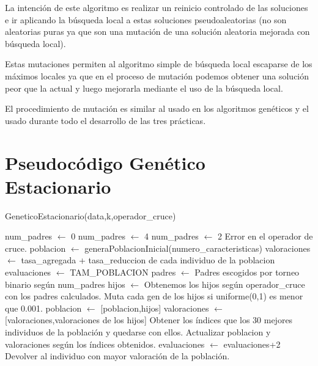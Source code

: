 \documentclass[12pt,a4paper]{article}
\begin{document}
	La intención de este algoritmo es realizar un reinicio controlado de las soluciones e ir aplicando la búsqueda local a estas soluciones pseudoaleatorias (no son aleatorias puras ya que son una mutación de una solución aleatoria mejorada con búsqueda local).
	
	Estas mutaciones permiten al algoritmo simple de búsqueda local escaparse de los máximos locales ya que en el proceso de mutación podemos obtener una solución peor que la actual y luego mejorarla mediante el uso de la búsqueda local.
	
	El procedimiento de mutación es similar al usado en los algoritmos genéticos y el usado durante todo el desarrollo de las tres prácticas.

	\section{Pseudocódigo Genético Estacionario}
	\label{sec:GE}


	\begin{algorithm}
		\caption{GeneticoEstacionario(data,k,operador\_cruce)}
		\begin{algorithmic}
			\STATE num\_padres $\leftarrow$ 0
				\STATE num\_padres $\leftarrow$ 4
				\STATE num\_padres $\leftarrow$ 2
			\ELSE
				\STATE Error en el operador de cruce.
			\ENDIF
			\STATE
			\STATE poblacion $\leftarrow$ generaPoblacionInicial(numero\_caracteristicas)
			\STATE valoraciones $\leftarrow$ tasa\_agregada + tasa\_reduccion de cada individuo de la poblacion
			\STATE evaluaciones $\leftarrow$ TAM\_POBLACION
				\STATE padres $\leftarrow$ Padres escogidos por torneo binario según num\_padres
				\STATE hijos $\leftarrow$ Obtenemos los hijos según operador\_cruce con los padres calculados.
				\STATE
				\STATE Muta cada gen de los hijos si uniforme(0,1) es menor que 0.001.
				\STATE poblacion $\leftarrow$ [poblacion,hijos]
				\STATE valoraciones $\leftarrow$ [valoraciones,valoraciones de los hijos]
				\STATE Obtener los índices que los 30 mejores individuos de la población y quedarse con ellos.
				\STATE Actualizar poblacion y valoraciones según los índices obtenidos.
				\STATE evaluaciones $\leftarrow$ evaluaciones+2
			\ENDWHILE
			\RETURN Devolver al individuo con mayor valoración de la población.
		\end{algorithmic}
	\end{algorithm}
\end{document}
